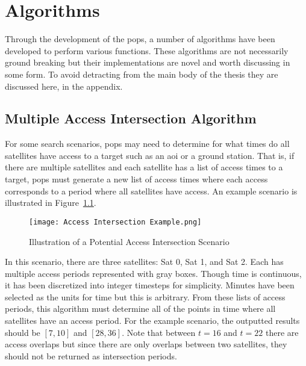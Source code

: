 \glsresetall{} 
\appendix

\chapter{Algorithms} \label{chap:Algorithms}


Through the development of the \gls{pops}, a number of algorithms have been
developed to perform various functions. These algorithms are not necessarily
ground breaking but their implementations are novel and worth discussing in
some form. To avoid detracting from the main body of the thesis they are
discussed here, in the appendix.


\section{Multiple Access Intersection Algorithm} \label{alg:mul-access-inter}

For some search scenarios, \gls{pops} may need to determine for what times do all
satellites have access to a target such as an \gls{aoi} or a ground station.
That is, if there are multiple satellites and each satellite has a list of
access times to a target, \gls{pops} must generate a new list of access times where
each access corresponds to a period where all satellites have access. An
example scenario is illustrated in Figure~\ref{fig:access_intersect}.


\begin{figure}[h]
    \texttt{[image: Access Intersection Example.png]} 
    \caption{Illustration of a Potential Access Intersection Scenario}
\label{fig:access_intersect}
\end{figure}

In this scenario, there are three satellites: Sat 0, Sat 1, and Sat 2. Each has
multiple access periods represented with gray boxes. Though time is continuous,
it has been discretized into integer timesteps for simplicity. Minutes have
been selected as the units for time but this is arbitrary. From these lists of
access periods, this algorithm must determine all of the points in time where
all satellites have an access period. For the example scenario, the outputted
results should be $[7,10]$ and $[28,36]$. Note that between $t = 16$ and $t=22$
there are access overlaps but since there are only overlaps between two
satellites, they should not be returned as intersection periods.

